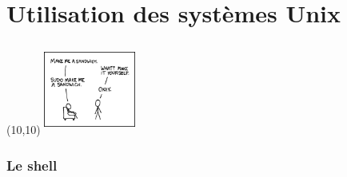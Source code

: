 %
%
%

\part{Utilisation des systèmes Unix}

{
\begin{frame}[plain]
  \partpage
  \begin{textblock}{10}(10,10)
    \includegraphics[height=30mm,width=30mm]{pics/sandwich}
  \end{textblock}
\end{frame}
}

\begin{frame}
  \tableofcontents
\end{frame}

\section{Le shell}

